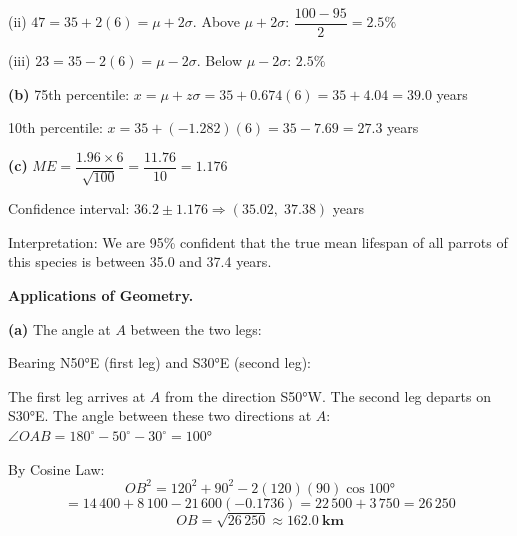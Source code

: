 \documentclass[addpoints]{exam}
\begin{document}
\begin{questions}
\begin{solution}[11cm]
(ii) $47 = 35 + 2(6) = \mu + 2\sigma$. Above $\mu + 2\sigma$: $\dfrac{100-95}{2} = \mathbf{2.5\%}$

(iii) $23 = 35 - 2(6) = \mu - 2\sigma$. Below $\mu - 2\sigma$: $\mathbf{2.5\%}$

\textbf{(b)} 75th percentile: $x = \mu + z\sigma = 35 + 0.674(6) = 35 + 4.04 = \mathbf{39.0}$ years

10th percentile: $x = 35 + (-1.282)(6) = 35 - 7.69 = \mathbf{27.3}$ years

\textbf{(c)} $ME = \dfrac{1.96 \times 6}{\sqrt{100}} = \dfrac{11.76}{10} = 1.176$

Confidence interval: $36.2 \pm 1.176 \Rightarrow \mathbf{(35.02,\; 37.38)}$ years

Interpretation: We are 95\% confident that the true mean lifespan of all parrots of this species is between 35.0 and 37.4 years.
\end{solution}

\question[8] \textbf{Applications of Geometry.}
\begin{solution}[11cm]
\textbf{(a)} The angle at $A$ between the two legs:

Bearing N\ang{50}E (first leg) and S\ang{30}E (second leg):

The first leg arrives at $A$ from the direction S\ang{50}W.
The second leg departs on S\ang{30}E.
The angle between these two directions at $A$:
$\angle OAB = 180^\circ - 50^\circ - 30^\circ = \ang{100}$

By Cosine Law:
\[OB^2 = 120^2 + 90^2 - 2(120)(90)\cos\ang{100}\]
\[= 14\,400 + 8\,100 - 21\,600(-0.1736) = 22\,500 + 3\,750 = 26\,250\]
\[OB = \sqrt{26\,250} \approx \mathbf{\SI{162.0}{km}}\]


\end{solution}
\end{questions}
\end{document}

